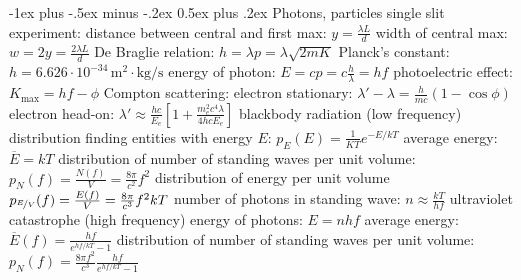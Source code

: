 \documentclass[10pt,landscape]{article}
\makeatletter
\renewcommand{\subsection}{\@startsection{subsection}{2}{0mm}%
                                {-1ex plus -.5ex minus -.2ex}%
                                {0.5ex plus .2ex}%
                                {\normalfont\normalsize\bfseries}}
\newcommand{\spc}{\hspace*{1em}}
\makeatother
\begin{document}
\begin{multicols*}{3}
\subsection{Photons, particles}
single slit experiment: 
\newline
\spc distance between central and first max: $y=\frac{\lambda L}{d}$
\newline
\spc width of central max: $w=2y=\frac{2\lambda L}{d}$
\newline
De Braglie relation: $h=\lambda p=\lambda \sqrt{2mK}$
\newline
Planck's constant: $h=6.626\cdot 10^{-34}\,\mathrm{m}^2\cdot\textrm{kg}/\textrm{s}$
\newline
energy of photon: $E=cp=c\frac{h}{\lambda}=hf$
\newline
photoelectric effect: $K_{\mathrm{max}}=hf-\phi$
\newline
Compton scattering:
\newline
\spc electron stationary: $\lambda '-\lambda=\frac{h}{mc}(1-\cos\phi)$
\newline
\spc electron head-on: $\lambda '\approx \frac{hc}{E_e}\left [ 1+\frac{m_e^2c^4\lambda}{4hcE_e} \right ]$
\newpage
blackbody radiation (low frequency)
\newline
\spc distribution finding entities with energy $E$:
\newline
\spc \spc$p_E(E)=\frac{1}{KT}e^{-E/kT}$
\newline
\spc \spc average energy: $\overline{E}=kT$
\newline
\spc distribution of number of standing waves per unit volume:
\newline
\spc \spc $p_N(f)=\frac{N(f)}{V}=\frac{8\pi}{c^2}f^2$
\newline
\spc distribution of energy per unit volume
\newline
\spc \spc $p_{\nicefrac{E}{V}}(f)=\frac{E(f)}{V}=\frac{8\pi}{c^3}f^2kT$
\newline
\spc number of photons in standing wave: $n\approx \frac{kT}{hf}$
\newline
ultraviolet catastrophe (high frequency)
\newline
\spc energy of photons: $E=nhf$
\newline
\spc average energy: $\overline{E}(f)=\frac{hf}{e^{hf/kT}-1}$
\newline
\spc distribution of number of standing waves per unit volume:
\newline
\spc \spc $p_N(f)=\frac{8\pi f^2}{c^3}\frac {hf}{e^{hf/kT}-1}$
\newline

\end{multicols*}
\end{document}
